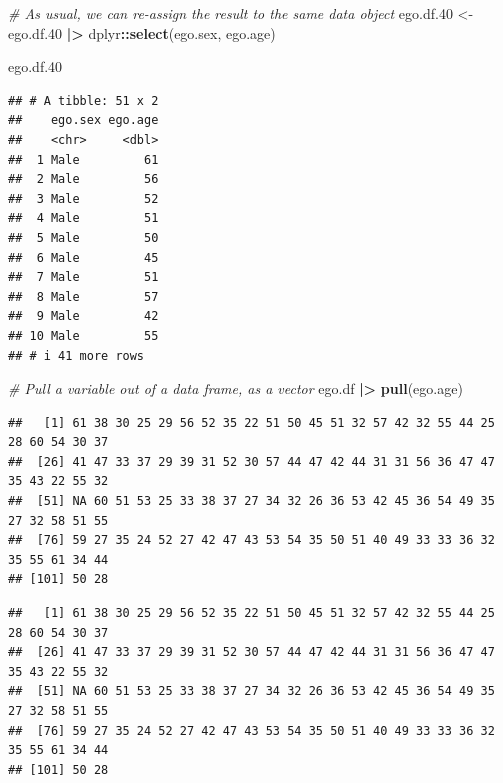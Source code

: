 \documentclass[
]{book}
\newenvironment{Shaded}{\begin{snugshade}}{\end{snugshade}}
\newcommand{\CommentTok}[1]{\textcolor[rgb]{0.56,0.35,0.01}{\textit{#1}}}
\newcommand{\FloatTok}[1]{\textcolor[rgb]{0.00,0.00,0.81}{#1}}
\newcommand{\FunctionTok}[1]{\textcolor[rgb]{0.13,0.29,0.53}{\textbf{#1}}}
\newcommand{\NormalTok}[1]{#1}
\newcommand{\OtherTok}[1]{\textcolor[rgb]{0.56,0.35,0.01}{#1}}
\newcommand{\SpecialCharTok}[1]{\textcolor[rgb]{0.81,0.36,0.00}{\textbf{#1}}}
\begin{document}
\begin{Shaded}
\begin{Highlighting}[]
\CommentTok{\# As usual, we can re{-}assign the result to the same data object}
\NormalTok{ego.df}\FloatTok{.40} \OtherTok{\textless{}{-}}\NormalTok{ ego.df}\FloatTok{.40} \SpecialCharTok{|\textgreater{}} 
\NormalTok{  dplyr}\SpecialCharTok{::}\FunctionTok{select}\NormalTok{(ego.sex, ego.age)}

\NormalTok{ego.df}\FloatTok{.40}
\end{Highlighting}
\end{Shaded}

\begin{verbatim}
## # A tibble: 51 x 2
##    ego.sex ego.age
##    <chr>     <dbl>
##  1 Male         61
##  2 Male         56
##  3 Male         52
##  4 Male         51
##  5 Male         50
##  6 Male         45
##  7 Male         51
##  8 Male         57
##  9 Male         42
## 10 Male         55
## # i 41 more rows
\end{verbatim}

\begin{Shaded}
\begin{Highlighting}[]
\CommentTok{\# Pull a variable out of a data frame, as a vector}
\NormalTok{ego.df }\SpecialCharTok{|\textgreater{}}
  \FunctionTok{pull}\NormalTok{(ego.age)}
\end{Highlighting}
\end{Shaded}

\begin{verbatim}
##   [1] 61 38 30 25 29 56 52 35 22 51 50 45 51 32 57 42 32 55 44 25 28 60 54 30 37
##  [26] 41 47 33 37 29 39 31 52 30 57 44 47 42 44 31 31 56 36 47 47 35 43 22 55 32
##  [51] NA 60 51 53 25 33 38 37 27 34 32 26 36 53 42 45 36 54 49 35 27 32 58 51 55
##  [76] 59 27 35 24 52 27 42 47 43 53 54 35 50 51 40 49 33 33 36 32 35 55 61 34 44
## [101] 50 28
\end{verbatim}

\begin{Shaded}
\end{Shaded}

\begin{verbatim}
##   [1] 61 38 30 25 29 56 52 35 22 51 50 45 51 32 57 42 32 55 44 25 28 60 54 30 37
##  [26] 41 47 33 37 29 39 31 52 30 57 44 47 42 44 31 31 56 36 47 47 35 43 22 55 32
##  [51] NA 60 51 53 25 33 38 37 27 34 32 26 36 53 42 45 36 54 49 35 27 32 58 51 55
##  [76] 59 27 35 24 52 27 42 47 43 53 54 35 50 51 40 49 33 33 36 32 35 55 61 34 44
## [101] 50 28
\end{verbatim}
\end{document}
